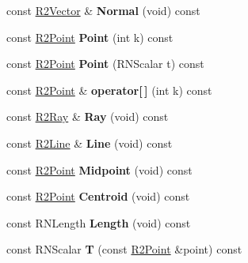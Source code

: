 \begin{DoxyCompactItemize}
\item 
const \hyperlink{class_r2_vector}{R2\+Vector} \& {\bfseries Normal} (void) const \hypertarget{class_r2_span_a481642f8778e123384cc14db2ffe4145}{}\label{class_r2_span_a481642f8778e123384cc14db2ffe4145}

\item 
const \hyperlink{class_r2_point}{R2\+Point} {\bfseries Point} (int k) const \hypertarget{class_r2_span_ab6f9f6e9e95852676072efb4f94fac45}{}\label{class_r2_span_ab6f9f6e9e95852676072efb4f94fac45}

\item 
const \hyperlink{class_r2_point}{R2\+Point} {\bfseries Point} (R\+N\+Scalar t) const \hypertarget{class_r2_span_ae88e7e33bd5860590bb4717d28cc3eae}{}\label{class_r2_span_ae88e7e33bd5860590bb4717d28cc3eae}

\item 
const \hyperlink{class_r2_point}{R2\+Point} \& {\bfseries operator\mbox{[}$\,$\mbox{]}} (int k) const \hypertarget{class_r2_span_af63e910c1ab5f9e177c4227eae413c99}{}\label{class_r2_span_af63e910c1ab5f9e177c4227eae413c99}

\item 
const \hyperlink{class_r2_ray}{R2\+Ray} \& {\bfseries Ray} (void) const \hypertarget{class_r2_span_ad6c53967f91585fd409065bcd56f7ebd}{}\label{class_r2_span_ad6c53967f91585fd409065bcd56f7ebd}

\item 
const \hyperlink{class_r2_line}{R2\+Line} \& {\bfseries Line} (void) const \hypertarget{class_r2_span_aeab7c8842b838cab4192ccbba194183f}{}\label{class_r2_span_aeab7c8842b838cab4192ccbba194183f}

\item 
const \hyperlink{class_r2_point}{R2\+Point} {\bfseries Midpoint} (void) const \hypertarget{class_r2_span_a0adeb97a390a68a3b660face5ee54e0e}{}\label{class_r2_span_a0adeb97a390a68a3b660face5ee54e0e}

\item 
const \hyperlink{class_r2_point}{R2\+Point} {\bfseries Centroid} (void) const \hypertarget{class_r2_span_a144edd0a9476eb63edf3fdc3a7be301e}{}\label{class_r2_span_a144edd0a9476eb63edf3fdc3a7be301e}

\item 
const R\+N\+Length {\bfseries Length} (void) const \hypertarget{class_r2_span_aef2f5da746c7c8c830dfc1bf911c0bd9}{}\label{class_r2_span_aef2f5da746c7c8c830dfc1bf911c0bd9}

\item 
const R\+N\+Scalar {\bfseries T} (const \hyperlink{class_r2_point}{R2\+Point} \&point) const \hypertarget{class_r2_span_ab5f96e4bce51b67bdd0f04827edb6bc3}{}\label{class_r2_span_ab5f96e4bce51b67bdd0f04827edb6bc3}


\end{DoxyCompactItemize}
